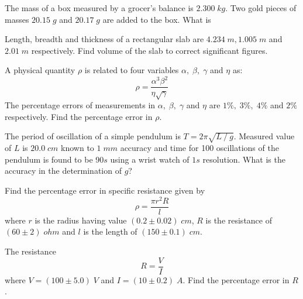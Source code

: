 \documentclass[10pt, a4paper, twoside]{exam}
\begin{document}
\begin{questions}
        
        \question The mass of a box measured by a grocer's balance is $2.300 \; kg$. Two gold pieces of masses $20.15 \; g$ and $20.17 \; g$ are added to the box. What is 
        
        
        \question Length, breadth and thickness of a rectangular slab are $4.234 \; m, 1.005 \; m $ and $ 2.01 \; m$ respectively. Find volume of the slab to correct significant figures.
        
        \question A physical quantity $\rho$ is related to four variables $\alpha, \; \beta, \; \gamma$ and $\eta$ as: \[ \rho = \frac{\alpha^3\beta^2}{\eta\sqrt{\gamma}} \] The percentage errors of measurements in $\alpha, \; \beta, \; \gamma$ and $\eta$ are $1\%,\; 3\%, \;4\%$ and $2\%$ respectively. Find the percentage error in $\rho$.
        
        \question The period of oscillation of a simple pendulum is $T=2\pi\sqrt{L⁄g}$. Measured value of $L$ is $20.0\; cm$ known to $1\; mm$ accuracy and time for 100 oscillations of the pendulum is found to be 90$s$ using a wrist watch of $1s$ resolution. What is the accuracy in the determination of $g$?
        
		\question Find the percentage error in specific resistance given by \[\rho = \frac{\pi r^{2}R}{l}\] where $r$ is the radius having value $(0.2 \pm 0.02) \;cm$, $R$ is the resistance of $(60 \pm 2) \;ohm$ and $l$ is the length of $(150 \pm 0.1)\; cm$.      
		
		\question The resistance \[ R=\frac{V}{I}\] where $V = (100 \pm 5.0) \;V$ and $I = (10 \pm 0.2) \;A$. Find the percentage error in $R$.
		

\end{questions}
\end{document}
